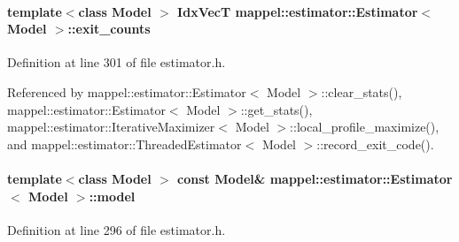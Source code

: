 \paragraph[{\texorpdfstring{exit\+\_\+counts}{exit_counts}}]{\setlength{\rightskip}{0pt plus 5cm}template$<$class Model $>$ {\bf Idx\+VecT} {\bf mappel\+::estimator\+::\+Estimator}$<$ Model $>$\+::exit\+\_\+counts\hspace{0.3cm}{\ttfamily [protected]}}\hypertarget{classmappel_1_1estimator_1_1Estimator_aa946d9789a1299d684f83a822a10caa7}{}\label{classmappel_1_1estimator_1_1Estimator_aa946d9789a1299d684f83a822a10caa7}


Definition at line 301 of file estimator.\+h.



Referenced by mappel\+::estimator\+::\+Estimator$<$ Model $>$\+::clear\+\_\+stats(), mappel\+::estimator\+::\+Estimator$<$ Model $>$\+::get\+\_\+stats(), mappel\+::estimator\+::\+Iterative\+Maximizer$<$ Model $>$\+::local\+\_\+profile\+\_\+maximize(), and mappel\+::estimator\+::\+Threaded\+Estimator$<$ Model $>$\+::record\+\_\+exit\+\_\+code().

\paragraph[{\texorpdfstring{model}{model}}]{\setlength{\rightskip}{0pt plus 5cm}template$<$class Model $>$ const Model\& {\bf mappel\+::estimator\+::\+Estimator}$<$ Model $>$\+::model\hspace{0.3cm}{\ttfamily [protected]}}\hypertarget{classmappel_1_1estimator_1_1Estimator_a2f157410771fb79a20d4d54e505750d0}{}\label{classmappel_1_1estimator_1_1Estimator_a2f157410771fb79a20d4d54e505750d0}


Definition at line 296 of file estimator.\+h.



